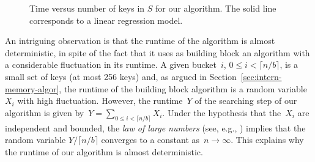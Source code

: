 \begin{figure}[htb]
\begin{center}
\caption{Time versus number of keys in $S$ for our algorithm. The solid line corresponds to 
a linear regression model.}
\label{fig:brz_temporegressao}
\end{center}
\vspace{-9mm}
\end{figure}

An intriguing observation is that the runtime of the algorithm is almost
deterministic, in spite of the fact that it uses as building block an
algorithm with a considerable fluctuation in its runtime.  A given bucket~$i$,
$0 \leq i < \lceil n/b \rceil$, is a small set of keys (at most 256 keys) and,
as argued in Section~\ref{sec:intern-memory-algor}, the runtime of the
building block algorithm is a random variable~$X_i$ with high fluctuation.
However, the runtime~$Y$ of the searching step of our algorithm is given
by~$Y=\sum_{0\leq i<\lceil n/b\rceil}X_i$.  Under the hypothesis that
the~$X_i$ are independent and bounded, the {\it law of large numbers} (see,
e.g., \cite{j91}) implies that the random variable $Y/\lceil n/b\rceil$
converges to a constant as~$n\to\infty$.  This explains why the runtime of our
algorithm is almost deterministic.


